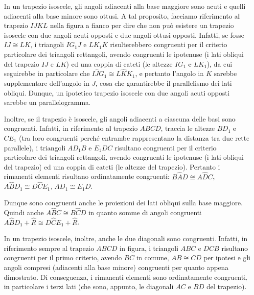 \noindent\begin{minipage}{0.7\textwidth}\parindent15pt
In un trapezio isoscele, gli angoli adiacenti alla base maggiore sono acuti e quelli adiacenti alla base minore sono ottusi. 
A tal proposito, facciamo riferimento al trapezio $IJKL$ nella figura a fianco per dire che non può esistere un trapezio isoscele con due angoli acuti opposti e due angoli ottusi opposti. Infatti, se fosse $IJ\cong LK$, i triangoli $IG_1J$ e $LK_1K$ risulterebbero congruenti per il criterio particolare dei triangoli rettangoli, avendo congruenti le ipotenuse (i lati obliqui del trapezio $IJ$ e $LK$) ed una coppia di cateti (le altezze $IG_1$ e $LK_1$), da cui seguirebbe in particolare che $I\widehat{J}G_1\cong L\widehat{K}K_1$, e pertanto l'angolo in $K$ sarebbe supplementare dell'angolo in $J$, cosa che garantirebbe il parallelismo dei lati obliqui. Dunque, un ipotetico trapezio isoscele con due angoli acuti opposti sarebbe un parallelogramma.
\end{minipage}\hfil
\begin{minipage}{0.3\textwidth}
	\centering
\end{minipage}

\noindent\begin{minipage}{0.7\textwidth}\parindent15pt
Inoltre, se il trapezio è isoscele, gli angoli adiacenti a ciascuna delle basi sono congruenti. 
Infatti, in riferimento al trapezio $ABCD$, traccia le altezze $BD_1$ e $CE_1$ (tra loro congruenti perché entrambe rappresentano la distanza tra due rette parallele), i triangoli $AD_1B$ e $E_1DC$ risultano congruenti per il criterio particolare dei triangoli rettangoli, avendo congruenti le ipotenuse (i lati obliqui del trapezio) ed una coppia di cateti (le altezze del trapezio). Pertanto i rimanenti elementi risultano ordinatamente congruenti: $B\widehat{A}D\cong A\widehat{D}C$, $A\widehat{B}D_1\cong D\widehat{C}E_1$, $AD_1\cong E_1D$.
\end{minipage}\hfil
\begin{minipage}{0.3\textwidth}
	\centering
\end{minipage}

Dunque sono congruenti  anche le proiezioni dei lati obliqui sulla base maggiore. 
Quindi anche $A\widehat{B}C\cong B\widehat{C}D$ in quanto somme di angoli congruenti $A\widehat{B}D_1+\widehat{R}\cong D\widehat{C}E_1+\widehat{R}$.

In un trapezio isoscele, inoltre, anche le due diagonali sono congruenti. Infatti, in riferimento sempre al trapezio $ABCD$ in figura, i triangoli $ABC$ e $DCB$ risultano congruenti per il primo criterio, avendo $BC$ in comune, $AB\cong CD$ per ipotesi e gli angoli compresi (adiacenti alla base minore) congruenti per quanto appena dimostrato. Di conseguenza, i rimanenti elementi sono ordinatamente congruenti, in particolare i terzi lati (che sono, appunto, le diagonali $AC$ e $BD$ del trapezio).

